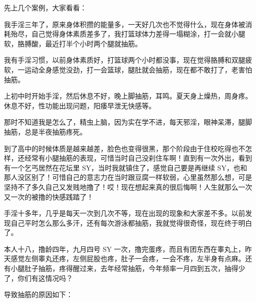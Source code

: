 先上几个案例，大家看看：

\begin{case}[抽筋]
    我手淫三年了，原来身体积攒的能量多，一天好几次也不觉得什么，现在身体被消耗殆尽，自己觉得身体素质差多了，我打篮球体力差得一塌糊涂，打一会就小腿软，胳膊酸，最近打半个小时两个腿就抽筋。
\end{case}

\begin{case}[抽筋]
    我有手淫习惯，以前身体素质好，打篮球两个小时都没事，现在觉得胳膊和双腿疲软，一运动全身感觉没劲，打一会篮球，腿肚就会抽筋，现在都不敢打了，老害怕抽筋。
\end{case}

\begin{case}[抽筋]
    上初中时开始手淫，然后休息不好，晚上脚抽筋，耳鸣。夏天身上燥热，周身疼。休息不好，性功能出现问题，阳痿早泄无快感等。
\end{case}

\begin{case}[抽筋]
    那时不知道我是怎么了，精虫上脑，因为实在学不进，每天邪淫，眼神呆滞，腿脚抽筋，总是半夜抽筋疼死。
\end{case}

\begin{case}[抽筋]
    到了高中的时候体质是越来越差，脸色也变得很黑，那个阶段由于住校吃得也不怎样，还经常有小腿抽筋的表现，可惜当时自己没刹住车啊！直到有一次外出，看到有一个乞丐居然在花坛里 SY，当时我就镇住了，感觉自己要是再继续 SY，也和那人没区别了！可惜自己的意志力在当时跟豆腐一样软弱，心里虽然那么想，可是坚持不了多久自己又发贱地撸了！哎！现在想起来真的很后悔啊！人生就那么一次又一次的被撸的快感践踏了！
\end{case}

\begin{case}[抽筋]
    手淫十多年，几乎是每天一次到几次不等，现在出现的现象和大家差不多。以前发现自己平时怎么那么多汗，还有每次游泳都抽筋，我就觉得很奇怪，现在终于明白了。
\end{case}

\begin{case}[抽筋]
    本人十八，撸龄四年，九月四号 SY 一次，撸完蛋疼，而且有团东西在睾丸上，昨天感觉左侧睾丸还疼，左侧屁股也疼，肚子一会疼，一会不疼，左半身有点麻。还有小腿肚子抽筋，疼得醒过来，去年经常抽筋，今年频率一月四到五次，抽得少了，你们有这情况吗？
\end{case}

导致抽筋的原因如下：

